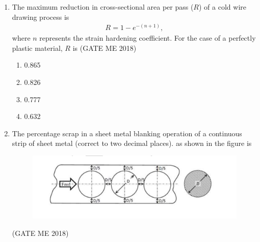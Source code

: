 \documentclass[journal]{IEEEtran}
\numberwithin{equation}{enumi}
\numberwithin{figure}{enumi}
\begin{document}
\begin{enumerate}
\item The maximum reduction in cross-sectional area per pass ($R$) of a cold wire drawing process is
\begin{align*}
R = 1 - e^{-(n+1)},
\end{align*}
where $n$ represents the strain hardening coefficient. For the case of a perfectly plastic material, $R$ is
\hfill{(GATE ME 2018)}
\begin{multicols}{2}
\begin{enumerate}
    
  \item 0.865
  \item 0.826
  \item 0.777
  \item 0.632
\end{enumerate}
\end{multicols}

\item The percentage scrap in a sheet metal blanking operation of a continuous strip of sheet metal
(correct to two decimal places).
as shown in the figure is
\begin{figure}[H]
    \centering
    \includegraphics[width = 0.6\columnwidth]{figs/fig3.9.png}
    \caption*{}
    \label{fig:Q36}
    \end{figure} 
    \hfill{(GATE ME 2018)}


\end{enumerate}
\end{document}
